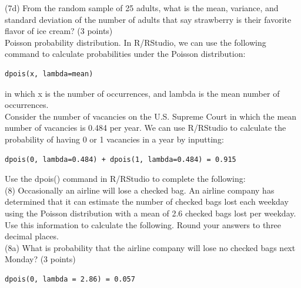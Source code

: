 \documentclass{article}
\begin{document}
(7d) From the random sample of 25 adults, what is the mean, variance, and standard deviation of the number of adults that say strawberry is their favorite flavor of ice cream? (3 points)\\

 

Poisson probability distribution. In R/RStudio, we can use the following command to calculate probabilities under the Poisson distribution:
\begin{center}
\begin{lstlisting}
dpois(x, lambda=mean)
\end{lstlisting}
\end{center}

in which x is the number of occurrences, and lambda is the mean number of occurrences.\\

Consider the number of vacancies on the U.S. Supreme Court in which the mean number of vacancies is 0.484 per year. We can use R/RStudio to calculate the probability of having 0 or 1 vacancies in a year by inputting:
\begin{center}
\begin{lstlisting}
dpois(0, lambda=0.484) + dpois(1, lambda=0.484) = 0.915
\end{lstlisting}
\end{center}

Use the dpois() command in R/RStudio to complete the following:\\

(8) Occasionally an airline will lose a checked bag. An airline company has determined that it can estimate the number of checked bags lost each weekday using the Poisson distribution with a mean of 2.6 checked bags lost per weekday. Use this information to calculate the following. Round your answers to three decimal places.\\


(8a) What is probability that the airline company will lose no checked bags next Monday? (3 points)
\begin{center}
\begin{lstlisting}
dpois(0, lambda = 2.86) = 0.057
\end{lstlisting}
\end{center}
\end{document}
